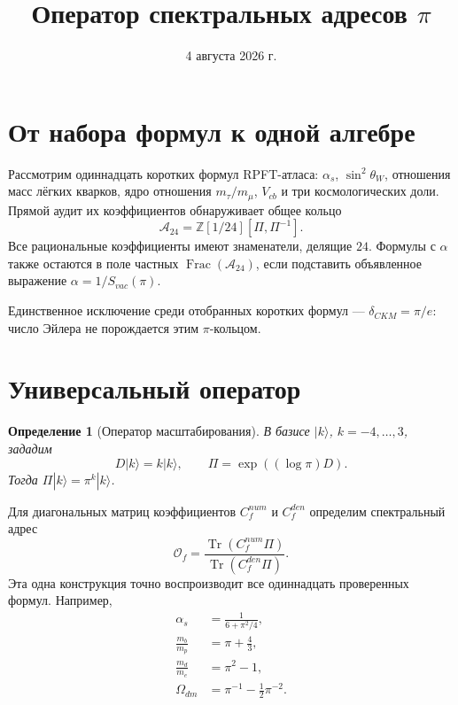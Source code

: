 \documentclass[12pt,a4paper]{article}
\title{Оператор спектральных адресов $\pi$}
\author{}
\date{4 августа 2026 г.}
\newtheorem{definition}{Определение}
\DeclareMathOperator{\Tr}{Tr}
\begin{document}
\maketitle

\section{От набора формул к одной алгебре}

Рассмотрим одиннадцать коротких формул RPFT-атласа: $\alpha_s$,
$\sin^2\theta_W$, отношения масс лёгких кварков, ядро отношения
$m_\tau/m_\mu$, $V_{cb}$ и три космологических доли. Прямой аудит их
коэффициентов обнаруживает общее кольцо
\begin{equation}
 \mathcal A_{24}=\mathbb Z[1/24][\Pi,\Pi^{-1}].
\end{equation}
Все рациональные коэффициенты имеют знаменатели, делящие $24$. Формулы с
$\alpha$ также остаются в поле частных $\operatorname{Frac}(\mathcal A_{24})$,
если подставить объявленное выражение $\alpha=1/S_{vac}(\pi)$.

Единственное исключение среди отобранных коротких формул ---
$\delta_{CKM}=\pi/e$: число Эйлера не порождается этим $\pi$-кольцом.

\section{Универсальный оператор}

\begin{definition}[Оператор масштабирования]
В базисе $|k\rangle$, $k=-4,\ldots,3$, зададим
\begin{equation}
 D|k\rangle=k|k\rangle,
 \qquad
 \Pi=\exp((\log\pi)D).
\end{equation}
Тогда $\Pi|k\rangle=\pi^k|k\rangle$.
\end{definition}

Для диагональных матриц коэффициентов $C_f^{num}$ и $C_f^{den}$ определим
спектральный адрес
\begin{equation}
 \mathcal O_f
 =\frac{\Tr(C_f^{num}\Pi)}{\Tr(C_f^{den}\Pi)}.
\end{equation}
Эта одна конструкция точно воспроизводит все одиннадцать проверенных формул.
Например,
\begin{align}
 \alpha_s&=\frac{1}{6+\pi^2/4},\\
 \frac{m_b}{m_p}&=\pi+\frac43,\\
 \frac{m_d}{m_e}&=\pi^2-1,\\
 \Omega_{dm}&=\pi^{-1}-\frac12\pi^{-2}.
\end{align}
\end{document}
